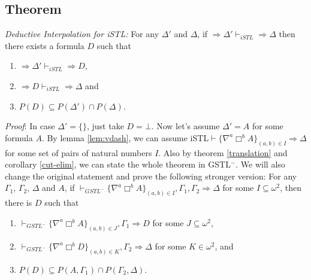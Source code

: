 \subsection{Theorem} \textit{Deductive Interpolation for iSTL: } For any $\Delta'$ and $\Delta$, if $\Rightarrow \Delta' \vdash_{iSTL} \Rightarrow \Delta$ then there exists a formula $D$ such that
\begin{enumerate}[label=(\arabic*)]
	\item $\Rightarrow \Delta' \vdash_{iSTL} \Rightarrow D$,
	\item $\Rightarrow D \vdash_{iSTL} \Rightarrow \Delta$ and
	\item $P(D) \subseteq P(\Delta') \cap P(\Delta)$.
\end{enumerate}

\textit{Proof}: In case $\Delta' = \{\}$, just take $D = \bot$. Now let's assume $\Delta' = A$ for some formula $A$. By lemma \ref{lem:vdash}, we can assume iSTL$\vdash \{ \nabla^a \Box^b A \}_{(a,b) \in I} \Rightarrow \Delta$ for some set of pairs of natural numbers $I$. Also by theorem \ref{translation} and corollary \ref{cut-elim}, we can state the whole theorem in GSTL$^-$. 
We will also change the original statement and prove the following stronger version: For any $\Gamma_1$, $\Gamma_2$, $\Delta$ and $A$, if $\vdash_{GSTL^-} \{ \nabla^a \Box^b A \}_{(a,b) \in I} , \Gamma_1 , \Gamma_2 \Rightarrow \Delta$ for some $I \subseteq \omega^2$, then there is $D$ such that
\begin{enumerate}[label=(\arabic*)]
	\item $\vdash_{GSTL^-} \{\nabla^a \Box^b A\}_{(a,b) \in J} , \Gamma_1 \Rightarrow D$ for some $J \subseteq \omega^2$, 
	\item $\vdash_{GSTL^-} \{ \nabla^a \Box^b D \}_{(a,b) \in K} , \Gamma_2 \Rightarrow \Delta$ for some $K \in \omega^2$, and
	\item $P(D) \subseteq P(A,\Gamma_1) \cap P(\Gamma_2,\Delta)$.
\end{enumerate}

